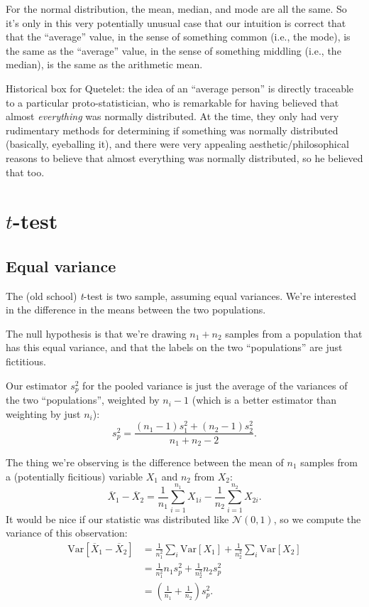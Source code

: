\documentclass{book}
\begin{document}
For the normal distribution, the mean, median, and mode are all the
same. So it's only in this very potentially unusual case that our
intuition is correct that that the ``average'' value, in the sense of
something common (i.e., the mode), is the same as the ``average'' value,
in the sense of something middling (i.e., the median), is the same as
the arithmetic mean.

Historical box for Quetelet: the idea of an ``average person'' is
directly traceable to a particular proto-statistician, who is remarkable
for having believed that almost \emph{everything} was normally
distributed. At the time, they only had very rudimentary methods for
determining if something was normally distributed (basically, eyeballing
it), and there were very appealing aesthetic/philosophical reasons to
believe that almost everything was normally distributed, so he believed
that too.

\section{$t$-test}

\subsection{Equal variance}\label{equal-variance}

The (old school) \emph{t}-test is two sample, assuming equal variances.
We're interested in the difference in the means between the two
populations.

The null hypothesis is that we're drawing \(n_1 + n_2\) samples from a
population that has this equal variance, and that the labels on the two
``populations'' are just fictitious.

Our estimator \(s_p^2\) for the pooled variance is just the average of
the variances of the two ``populations'', weighted by \(n_i - 1\) (which
is a better estimator than weighting by just \(n_i\)): \[
s_p^2 = \frac{(n_1 - 1) s_1^2 + (n_2 - 1) s_2^2}{n_1 + n_2 - 2}.
\]

The thing we're observing is the difference between the mean of \(n_1\)
samples from a (potentially ficitious) variable \(X_1\) and \(n_2\) from
\(X_2\): \[
\overline{X}_1 - \overline{X}_2 = \frac{1}{n_1} \sum_{i=1}^{n_1} X_{1i} - \frac{1}{n_2} \sum_{i=1}^{n_2} X_{2i}.
\] It would be nice if our statistic was distributed like
\(\mathcal{N}(0, 1)\), so we compute the variance of this observation:
\[
\begin{aligned}
\mathrm{Var}\left[ \overline{X}_1 - \overline{X}_2 \right]
  &= \frac{1}{n_1^2} \sum_i \mathrm{Var}[X_1] + \frac{1}{n_2^2} \sum_i \mathrm{Var}[X_2] \\
  &= \frac{1}{n_1^2} n_1 s_p^2 + \frac{1}{n_2^2} n_2 s_p^2 \\
  &= \left( \frac{1}{n_1} + \frac{1}{n_2} \right) s_p^2.
\end{aligned}
\]
\end{document}
